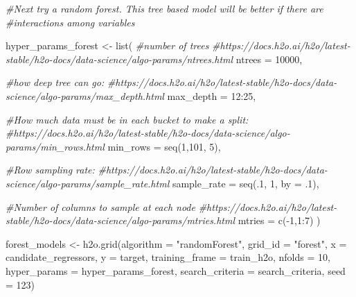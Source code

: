 \documentclass[
]{article}
\newenvironment{Shaded}{\begin{snugshade}}{\end{snugshade}}
\newcommand{\AttributeTok}[1]{\textcolor[rgb]{0.77,0.63,0.00}{#1}}
\newcommand{\CommentTok}[1]{\textcolor[rgb]{0.56,0.35,0.01}{\textit{#1}}}
\newcommand{\DecValTok}[1]{\textcolor[rgb]{0.00,0.00,0.81}{#1}}
\newcommand{\FunctionTok}[1]{\textcolor[rgb]{0.00,0.00,0.00}{#1}}
\newcommand{\NormalTok}[1]{#1}
\newcommand{\OtherTok}[1]{\textcolor[rgb]{0.56,0.35,0.01}{#1}}
\newcommand{\SpecialCharTok}[1]{\textcolor[rgb]{0.00,0.00,0.00}{#1}}
\newcommand{\StringTok}[1]{\textcolor[rgb]{0.31,0.60,0.02}{#1}}
\begin{document}
\begin{Shaded}
\begin{Highlighting}[]
\CommentTok{\#Next try a random forest. This tree based model will be better if there are }
\CommentTok{\#interactions among variables}

\NormalTok{hyper\_params\_forest }\OtherTok{\textless{}{-}} \FunctionTok{list}\NormalTok{(}
  \CommentTok{\#number of trees}
  \CommentTok{\#https://docs.h2o.ai/h2o/latest{-}stable/h2o{-}docs/data{-}science/algo{-}params/ntrees.html}
  \AttributeTok{ntrees =} \DecValTok{10000}\NormalTok{,  }
  
  \CommentTok{\#how deep tree can go:}
  \CommentTok{\#https://docs.h2o.ai/h2o/latest{-}stable/h2o{-}docs/data{-}science/algo{-}params/max\_depth.html}
  \AttributeTok{max\_depth =} \DecValTok{12}\SpecialCharTok{:}\DecValTok{25}\NormalTok{,}
  
  \CommentTok{\#How much data must be in each bucket to make a split:}
  \CommentTok{\#https://docs.h2o.ai/h2o/latest{-}stable/h2o{-}docs/data{-}science/algo{-}params/min\_rows.html}
  \AttributeTok{min\_rows =} \FunctionTok{seq}\NormalTok{(}\DecValTok{1}\NormalTok{,}\DecValTok{101}\NormalTok{, }\DecValTok{5}\NormalTok{),}
  
  \CommentTok{\#Row sampling rate:}
  \CommentTok{\#https://docs.h2o.ai/h2o/latest{-}stable/h2o{-}docs/data{-}science/algo{-}params/sample\_rate.html}
  \AttributeTok{sample\_rate =} \FunctionTok{seq}\NormalTok{(.}\DecValTok{1}\NormalTok{, }\DecValTok{1}\NormalTok{, }\AttributeTok{by =}\NormalTok{ .}\DecValTok{1}\NormalTok{),}
  
  \CommentTok{\#Number of columns to sample at each node}
  \CommentTok{\#https://docs.h2o.ai/h2o/latest{-}stable/h2o{-}docs/data{-}science/algo{-}params/mtries.html}
  \AttributeTok{mtries =} \FunctionTok{c}\NormalTok{(}\SpecialCharTok{{-}}\DecValTok{1}\NormalTok{,}\DecValTok{1}\SpecialCharTok{:}\DecValTok{7}\NormalTok{)}
\NormalTok{)}


\NormalTok{forest\_models }\OtherTok{\textless{}{-}} \FunctionTok{h2o.grid}\NormalTok{(}\AttributeTok{algorithm =} \StringTok{"randomForest"}\NormalTok{, }
                          \AttributeTok{grid\_id =} \StringTok{"forest"}\NormalTok{, }
                          \AttributeTok{x =}\NormalTok{ candidate\_regressors, }
                          \AttributeTok{y =}\NormalTok{ target, }
                          \AttributeTok{training\_frame =}\NormalTok{ train\_h2o, }
                          \AttributeTok{nfolds =} \DecValTok{10}\NormalTok{, }
                          \AttributeTok{hyper\_params =}\NormalTok{ hyper\_params\_forest, }
                          \AttributeTok{search\_criteria =}\NormalTok{ search\_criteria, }
                          \AttributeTok{seed =} \DecValTok{123}\NormalTok{)}


\end{Highlighting}
\end{Shaded}
\end{document}
